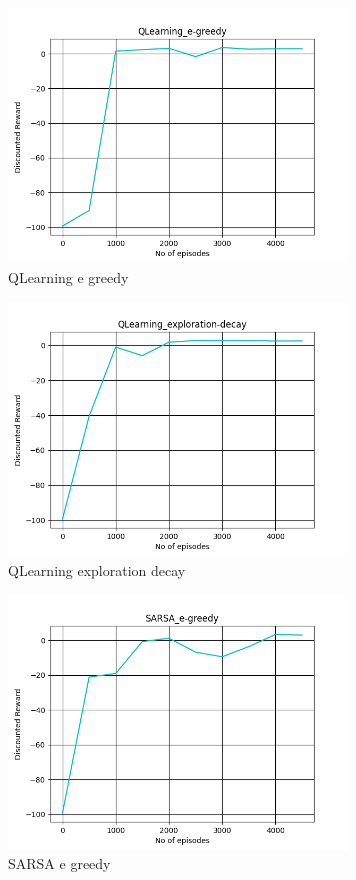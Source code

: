 \documentclass{article}
\begin{document}
\begin{enumerate}[a)]
\begin{center}
    \begin{figure}[H]
    \hfill\includegraphics[width=9cm]{QB2_QLearning_e-greedy.png}\hspace*{\fill}
    \caption{QLearning e greedy}
    \label{fig:QLearning_e-greedy}
\end{figure}
\end{center}

\begin{center}
    \begin{figure}[H]
    \hfill\includegraphics[width=9cm]{QB2_QLearning_exploration-decay.png}\hspace*{\fill}
    \caption{QLearning exploration decay}
    \label{fig:QLearning_exploration-decay}
\end{figure}
\end{center}

\begin{center}
    \begin{figure}[H]
    \hfill\includegraphics[width=9cm]{QB2_SARSA_e-greedy.png}\hspace*{\fill}
    \caption{SARSA e greedy}
    \label{fig:SARSA_e-greedy}
\end{figure}
\end{center}


\end{enumerate}
\end{document}
